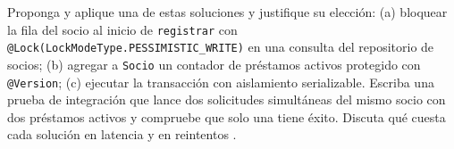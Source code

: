 \begin{practicaBox}[title={Práctica 5.1: cerrar la condición de carrera de la regla R2}]
	Proponga y aplique una de estas soluciones y justifique su elección: (a) bloquear la fila del socio al inicio de \texttt{registrar} con \texttt{@Lock(LockModeType.PESSIMISTIC\_WRITE)} en una consulta del repositorio de socios; (b) agregar a \texttt{Socio} un contador de préstamos activos protegido con \texttt{@Version}; (c) ejecutar la transacción con aislamiento serializable. Escriba una prueba de integración que lance dos solicitudes simultáneas del mismo socio con dos préstamos activos y compruebe que solo una tiene éxito. Discuta qué cuesta cada solución en latencia y en reintentos \cite{kleppmann2026designing}.
\end{practicaBox}
